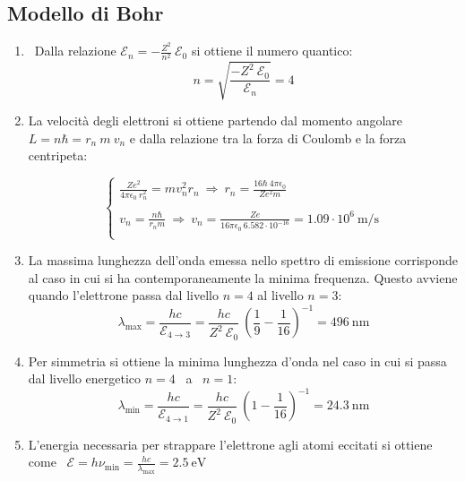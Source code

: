 \documentclass[12pt,twoside,a4]{article}
\begin{document}
\subsection{Modello di Bohr}
\begin{solution}

\begin{enumerate}[label=(\textit{\roman*})]
	\item \ Dalla relazione $\mathcal{E}_n = - \frac{Z^2}{n^2} \ \mathcal{E}_0$ si ottiene il numero quantico: \begin{equation*}
n = \sqrt{\frac{- Z^2 \ \mathcal{E}_0}{\mathcal{E}_n}} = 4    
\end{equation*}

\item La velocità degli elettroni si ottiene partendo dal momento angolare $L = n \hbar = r_n \ m \ v_n$  e dalla relazione tra la forza di Coulomb e la forza centripeta: 

 \begin{equation*}
\begin{cases}
    \frac{Z e^2}{4\pi \epsilon_0 \ r^2_n} = m v^2_n r_n  \  \Rightarrow  \  r_n = \frac{16 \hbar \ 4\pi \epsilon_0 }{Z e^2 m} \\
    \\
    v_n = \frac{n \hbar}{r_n m }  \  \Rightarrow  \  v_n = \frac{Z e}{16 \pi \epsilon_0 \ 6.582 \cdot 10^{-16}} = 1.09 \cdot 10^{6} \ \mathrm{m/s}\\
\end{cases}    
\end{equation*}

\item La massima lunghezza dell'onda emessa nello spettro di emissione corrisponde al caso in cui si ha contemporaneamente la minima frequenza. Questo avviene quando l'elettrone passa dal livello $n = 4$ al livello $n =3$: \begin{equation*}
 \lambda_{\mathrm{max}} = \frac{h c}{\mathcal{E}_{4 \rightarrow 3}} = \frac{h c }{Z^2 \ \mathcal{E}_0} \ \left(\frac{1}{9} - \frac{1}{16}\right)^{-1} = 496  \ \mathrm{nm}   
\end{equation*}

\item Per simmetria si ottiene la minima lunghezza d'onda nel caso in cui si passa dal livello energetico $n = 4$ \ a \ $n = 1$: \begin{equation*}
 \lambda_{\mathrm{min}} = \frac{h c}{\mathcal{E}_{4\rightarrow 1}} = \frac{h c }{Z^2 \ \mathcal{E}_0} \ \left(1 - \frac{1}{16}\right)^{-1} = 24.3  \ \mathrm{nm}   
\end{equation*}

\item L'energia necessaria per strappare l'elettrone agli atomi eccitati si ottiene come \ $\mathcal{E} = h \nu_{\mathrm{min}} = \frac{h c }{\lambda_{\mathrm{max}}} = 2.5 \ \mathrm{eV}$ 
\end{enumerate}
\end{solution}
\end{document}
